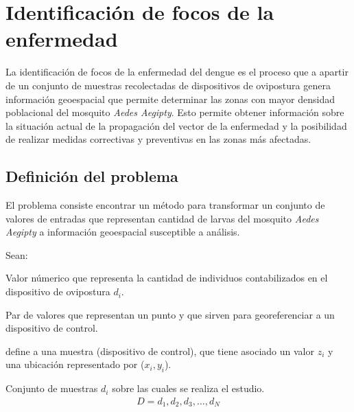 \section{Identificación de focos de la enfermedad}
La identificación de focos de la enfermedad del dengue es el proceso que a apartir de un conjunto de muestras recolectadas de dispositivos de ovipostura genera información geoespacial que permite determinar las zonas con mayor densidad poblacional del mosquito \textit{Aedes Aegipty}. Esto permite obtener información sobre la situación actual de la propagación del vector de la enfermedad y la posibilidad de realizar medidas correctivas y preventivas en las zonas más afectadas.
\subsection{Definición del problema}
El problema consiste encontrar un método para transformar un conjunto de valores de entradas que representan cantidad de larvas del mosquito \textit{Aedes Aegipty} a información geoespacial susceptible a análisis.

Sean:
\begin{description}[style=multiline,leftmargin=1.5cm]
    \item[$z_{i}$] Valor númerico que representa la cantidad de individuos contabilizados en el dispositivo de ovipostura $d_{i}$.
    
    \item[($x_{i},y_{i}$)] Par de valores que representan un punto y que sirven para georeferenciar a un dispositivo de control.  
    
    \item[$d_{i}$] define a una muestra (dispositivo de control), que tiene asociado un valor $z_{i}$ y una ubicación representado por ($x_{i},y_{i}$).

    \item[$D$] Conjunto de muestras $d_{i}$ sobre las cuales se realiza el estudio.
        \begin{align*}
            D = d_1,d_2,d_3,\ldots,d_N
        \end{align*}

\end{description}


